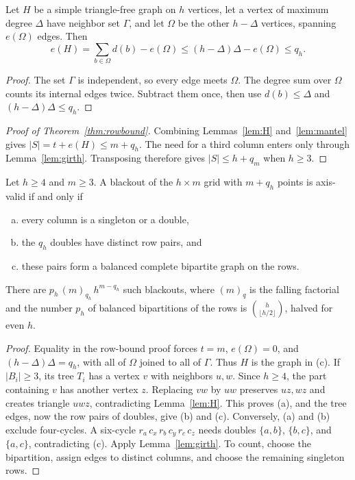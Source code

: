 \begin{lemma}\label{lem:mantel}
Let $H$ be a simple triangle-free graph on $h$ vertices, let a vertex of maximum degree $\Delta$ have neighbor set $\Gamma$, and let $\Omega$ be the other $h-\Delta$ vertices, spanning $e(\Omega)$ edges. Then
\[
e(H)=\sum_{b\in\Omega}d(b)-e(\Omega)\le(h-\Delta)\Delta-e(\Omega)\le q_h.
\]
\end{lemma}

\begin{proof}
The set $\Gamma$ is independent, so every edge meets $\Omega$.
The degree sum over $\Omega$ counts its internal edges twice.
Subtract them once, then use $d(b)\le\Delta$ and
$(h-\Delta)\Delta\le q_h$.
\end{proof}

\begin{proof}[Proof of Theorem~\ref{thm:rowbound}]
Combining Lemmas~\ref{lem:H} and~\ref{lem:mantel} gives
$|S|=t+e(H)\le m+q_h$. The need for a third column enters only through
Lemma~\ref{lem:girth}. Transposing therefore gives $|S|\le h+q_m$ when
$h\ge3$.
\end{proof}

\begin{theorem}\label{thm:equality}
Let $h\ge4$ and $m\ge3$. A blackout of the $h\times m$ grid with $m+q_h$ points is axis-valid if and only if
\begin{enumerate}[(a)]
\item every column is a singleton or a double,
\item the $q_h$ doubles have distinct row pairs, and
\item these pairs form a balanced complete bipartite graph on the rows.
\end{enumerate}
There are $p_h\,(m)_{q_h}\,h^{m-q_h}$ such blackouts, where $(m)_q$ is the falling factorial and the number $p_h$ of balanced bipartitions of the rows is $\binom h{\lfloor h/2\rfloor}$, halved for even $h$.
\end{theorem}

\begin{proof}
Equality in the row-bound proof forces $t=m$, $e(\Omega)=0$, and
$(h-\Delta)\Delta=q_h$, with all of $\Omega$ joined to all of $\Gamma$.
Thus $H$ is the graph in (c).
If $|B_i|\ge3$, its tree $T_i$ has a vertex $v$ with neighbors $u,w$.
Since $h\ge4$, the part containing $v$ has another vertex $z$.
Replacing $vw$ by $uw$ preserves $uz,wz$ and creates triangle $uwz$,
contradicting Lemma~\ref{lem:H}. This proves (a), and the tree edges,
now the row pairs of doubles, give (b) and (c).
Conversely, (a) and (b) exclude four-cycles. A six-cycle
$r_a\,c_x\,r_b\,c_y\,r_c\,c_z$ needs doubles $\{a,b\}$,
$\{b,c\}$, and $\{a,c\}$, contradicting (c).
Apply Lemma~\ref{lem:girth}. To count, choose the bipartition,
assign edges to distinct columns, and choose the remaining singleton rows.
\end{proof}

